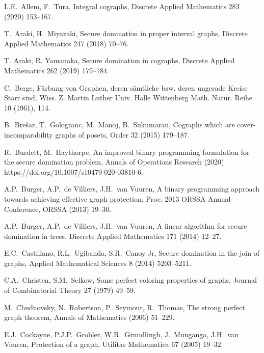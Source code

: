 \documentclass[12pt,a4paper,twoside]{article}
\theoremstyle{definition} %
\theoremstyle{plain} %
\numberwithin{equation}{section}  %
\begin{document}
\begin{thebibliography}{99}

    L.E.~Allem, F.~Tura,
    Integral cographs,
    Discrete Applied Mathematics 283 (2020) 153--167. 
    
    T.~Araki, H.~Miyazaki,
    Secure domination in proper interval graphs,
    Discrete Applied Mathematics 247 (2018) 70--76.
    
    T. Araki, R. Yamanaka,
    Secure domination in cographs,
    Discrete Applied Mathematics 262 (2019) 179--184.
    
    C.~Berge,
    F\"{a}rbung von Graphen, deren s\"{a}mtliche bzw. deren ungerade Kreise Starr sind,
    Wiss. Z. Martin Luther Univ. Halle Wittenberg Math. Natur. Reihe 10 (1961), 114.
    
    B.~Brešar, T.~Gologranc, M.~Manoj, B.~Sukumaran,
    Cographs which are cover-incomparability graphs of posets,
    Order 32 (2015) 179--187.

    R.~Burdett, M.~Haythorpe,
    An improved binary programming formulation for the secure domination problem,
    Annals of Operations Research (2020) https://doi.org/10.1007/s10479-020-03810-6.

    A.P.~Burger, A.P.~de Villiers, J.H.~van Vuuren,
    A binary programming approach towards achieving effective graph protection,
    Proc. 2013 ORSSA Annual Conference, ORSSA (2013) 19--30.

    A.P.~Burger, A.P.~de Villiers, J.H.~van Vuuren,
    A linear algorithm for secure domination in trees,
    Discrete Applied Mathematics 171 (2014) 12--27.

    E.C.~Castillano, R.L.~Ugibanda, S.R.~Canoy Jr,
    Secure domination in the join of graphs,
    Applied Mathematical Sciences 8 (2014) 5203--5211.
   
    C.A.~Christen, S.M.~Selkow,
    Some perfect coloring properties of graphs,
    Journal of Combinatorial Theory 27 (1979) 49--59.
    
    M.~Chudnovsky, N.~Robertson, P.~Seymour, R.~Thomas,
    The strong perfect graph theorem,
    Annals of Mathematics (2006) 51--229.
    
    E.J.~Cockayne, P.J.P.~Grobler, W.R.~Grundlingh, J.~Munganga, J.H.~van Vuuren,
    Protection of a graph,
    Utilitas Mathematica 67 (2005) 19--32.
    

\end{thebibliography}
\end{document}
